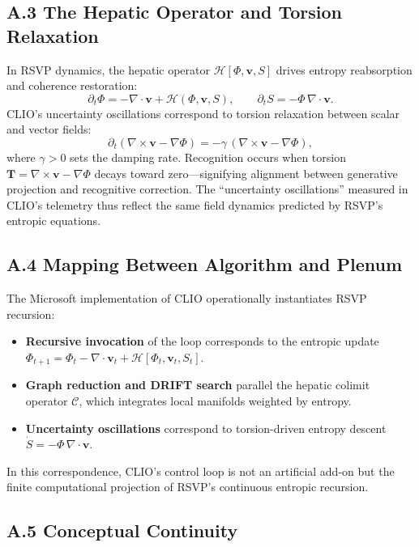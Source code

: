 \documentclass[11pt]{article}
\begin{document}
\subsection*{A.3 The Hepatic Operator and Torsion Relaxation}

In RSVP dynamics, the hepatic operator $\mathcal{H}[\Phi,\mathbf{v},S]$ drives
entropy reabsorption and coherence restoration:
\[
\partial_t \Phi = -\nabla\!\cdot\!\mathbf{v} + \mathcal{H}(\Phi,\mathbf{v},S),
\qquad
\partial_t S = -\Phi\,\nabla\!\cdot\!\mathbf{v}.
\]
CLIO’s uncertainty oscillations correspond to torsion relaxation between scalar
and vector fields:
\[
\partial_t(\nabla\times\mathbf{v}-\nabla\Phi)
 = -\gamma\,(\nabla\times\mathbf{v}-\nabla\Phi),
\]
where $\gamma>0$ sets the damping rate.
Recognition occurs when torsion $\mathbf{T}=\nabla\times\mathbf{v}-\nabla\Phi$
decays toward zero—signifying alignment between generative projection and
recognitive correction.  
The “uncertainty oscillations” measured in CLIO’s telemetry thus reflect the same
field dynamics predicted by RSVP’s entropic equations.

\subsection*{A.4 Mapping Between Algorithm and Plenum}

The Microsoft implementation of CLIO operationally instantiates RSVP recursion:
\begin{itemize}
    \item \textbf{Recursive invocation} of the loop corresponds to the entropic update  
    $\Phi_{t+1} = \Phi_t - \nabla\!\cdot\!\mathbf{v}_t + \mathcal{H}[\Phi_t,\mathbf{v}_t,S_t]$.
    \item \textbf{Graph reduction and DRIFT search} parallel the hepatic colimit operator
    $\mathcal{C}$, which integrates local manifolds weighted by entropy.
    \item \textbf{Uncertainty oscillations} correspond to torsion-driven entropy descent
    $\dot{S} = -\Phi\,\nabla\!\cdot\!\mathbf{v}$.
\end{itemize}
In this correspondence, CLIO’s control loop is not an artificial add-on but the
finite computational projection of RSVP’s continuous entropic recursion.

\subsection*{A.5 Conceptual Continuity}
\end{document}
